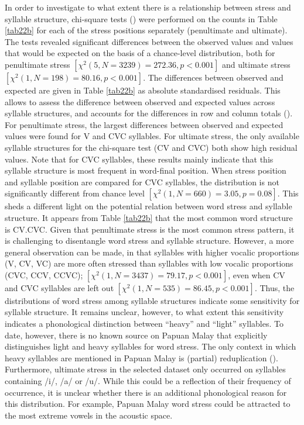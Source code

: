 In order to investigate to what extent there is a relationship between stress and syllable structure, chi-square tests (\citealt{rcoreteam_project_2017}) were performed on the counts in Table \ref{tab22b} for each of the stress positions separately (penultimate and ultimate). The tests revealed significant differences between the observed values and values that would be expected on the basis of a chance-level distribution, both for penultimate stress $[\chi^{2}(5, N = 3239) = 272.36, p < 0.001]$ and ultimate stress $[\chi^{2}(1, N = 198) = 80.16, p < 0.001]$. The differences between observed and expected are given in Table \ref{tab22b} as absolute standardised residuals. This allows to assess the difference between observed and expected values across syllable structures, and accounts for the differences in row and column totals (\citealt{agresti_introduction_2007}). For penultimate stress, the largest differences between observed and expected values were found for V and CVC syllables. For ultimate stress, the only available syllable structures for the chi-square test (CV and CVC) both show high residual values. Note that for CVC syllables, these results mainly indicate that this syllable structure is most frequent in word-final position. When stress position and syllable position are compared for CVC syllables, the distribution is not significantly different from chance level $[\chi^{2}(1, N = 660) = 3.05, p = 0.08]$. This sheds a different light on the potential relation between word stress and syllable structure. It appears from Table \ref{tab22b} that the most common word structure is CV.CVC. Given that penultimate stress is the most common stress pattern, it is challenging to disentangle word stress and syllable structure. However, a more general observation can be made, in that syllables with higher vocalic proportions (V, CV, VC) are more often stressed than syllables with low vocalic proportions (CVC, CCV, CCVC); $[\chi^{2}(1, N = 3437) = 79.17, p < 0.001]$, even when CV and CVC syllables are left out $[\chi^{2}(1, N = 535) = 86.45, p < 0.001]$. Thus, the distributions of word stress among syllable structures indicate some sensitivity for syllable structure. It remains unclear, however, to what extent this sensitivity indicates a phonological distinction between ``heavy'' and ``light'' syllables. To date, however, there is no known source on Papuan Malay that explicitly distinguishes light and heavy syllables for word stress. The only context in which heavy syllables are mentioned in Papuan Malay is (partial) reduplication (\citealt[ch.4]{kluge_grammar_2017}). Furthermore, ultimate stress in the selected dataset only occurred on syllables containing /i/, /a/ or /u/. While this could be a reflection of their frequency of occurrence, it is unclear whether there is an additional phonological reason for this distribution. For example, Papuan Malay word stress could be attracted to the most extreme vowels in the acoustic space.

